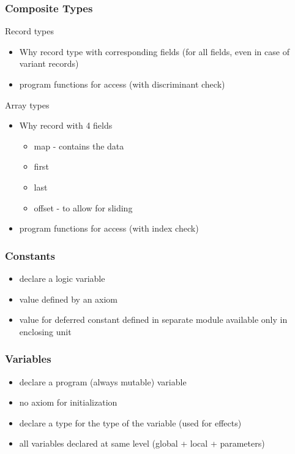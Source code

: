 \documentclass{beamer}
\newenvironment{specialframe}{%
  \begin{frame}[fragile,environment=specialframe]}{\end{frame}}
\begin{document}
\begin{specialframe}\frametitle{Composite Types}
   \begin{block}{Record types}
      \begin{itemize}
         \item Why record type with corresponding fields
               (for all fields, even in case of variant records)
         \item program functions for access (with discriminant check)
      \end{itemize}
   \end{block}

   \begin{block}{Array types}
      \begin{itemize}
      \item Why record with 4 fields
        \begin{itemize}
        \item map - contains the data
        \item first
        \item last
        \item offset - to allow for sliding
        \end{itemize}
      \item program functions for access (with index check)
      \end{itemize}
   \end{block}
\end{specialframe}

\begin{specialframe}\frametitle{Constants}
   \begin{itemize}
      \item declare a logic variable
      \item value defined by an axiom
      \item value for deferred constant defined in separate module available
        only in enclosing unit
   \end{itemize}
\end{specialframe}

\begin{specialframe}\frametitle{Variables}
   \begin{itemize}
      \item declare a program (always mutable) variable
      \item no axiom for initialization
      \item declare a type for the type of the variable (used for effects)
      \item all variables declared at same level (global + local + parameters)
   \end{itemize}
\end{specialframe}
\end{document}
